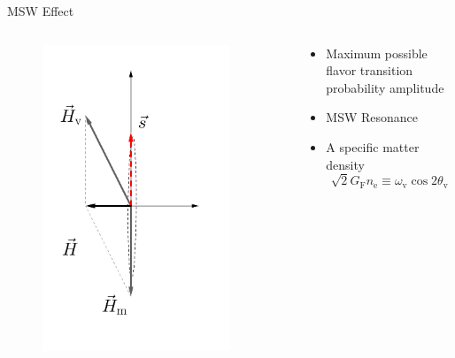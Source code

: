 \documentclass[9pt]{beamer}
\begin{document}
\begin{darkframes}
\begin{frame}{MSW Effect}
{}

 {


\begin{columns}[T]
\begin{column}{0.5\textwidth}



\begin{figure}
    \centering
    \colorbox{white}{\includegraphics[width=0.9\textwidth]{assets/matter-effect-critical-density}}
\end{figure}


\end{column}%
\begin{column}{0.5\textwidth}



\begin{itemize}
\item
Maximum possible flavor transition probability amplitude
\item
MSW Resonance
\item
A specific matter density
\begin{equation*}
    \sqrt{2}G_{\mathrm F}n_{\mathrm e} \equiv \omega_{\mathrm v}\cos 2\theta_{\mathrm v}
\end{equation*}



\end{itemize}
\end{column}
\end{columns}}
\end{frame}
\end{darkframes}
\end{document}
